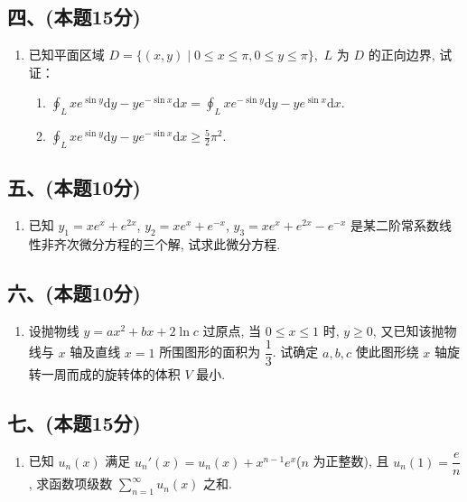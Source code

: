 \subsection*{四、(本题15分)}

\begin{enumerate}[start=7]
    \item 已知平面区域
          $D = \{(x,  y) \mid 0 \leq x \leq \pi,  0 \leq y \leq \pi\},  $
          $L$ 为 $D$ 的正向边界,  试证：
          \begin{enumerate}
              \item [(1)] $\displaystyle\oint_L x e^{\sin y}  \mathrm{d}y - y e^{-\sin x}  \mathrm{d}x = \oint_L x e^{-\sin y}  \mathrm{d}y - y e^{\sin x}  \mathrm{d}x$.
              \item [(2)] $\displaystyle\oint_L x e^{\sin y}  \mathrm{d}y - y e^{-\sin x}  \mathrm{d}x \geq \frac{5}{2} \pi^2$.
          \end{enumerate}
\end{enumerate}

\subsection*{五、(本题10分)}

\begin{enumerate}[start=8]
    \item 已知 $y_1 = x e^x + e^{2x}$,  $y_2 = x e^x + e^{-x}$,  $y_3 = x e^x + e^{2x} - e^{-x}$ 是某二阶常系数线性非齐次微分方程的三个解,  试求此微分方程.
\end{enumerate}

\subsection*{六、(本题10分)}

\begin{enumerate}[start=9]
    \item 设抛物线 $y = ax^2 + bx + 2 \ln c$ 过原点,  当 $0 \leq x \leq 1$ 时,  $y \geq 0$,  又已知该抛物线与 $x$ 轴及直线 $x = 1$ 所围图形的面积为 $\dfrac{1}{3}$. 试确定 $a,  b,  c$ 使此图形绕 $x$ 轴旋转一周而成的旋转体的体积 $V$ 最小.
\end{enumerate}

\subsection*{七、(本题15分)}

\begin{enumerate}[start=10]
    \item 已知 $u_n(x)$ 满足 $u_n'(x) = u_n(x) + x^{n - 1} e^x$($n$ 为正整数),  且 $u_n(1) = \dfrac{e}{n}$,  求函数项级数 $\displaystyle\sum_{n = 1}^{\infty} u_n(x)$ 之和.
\end{enumerate}

